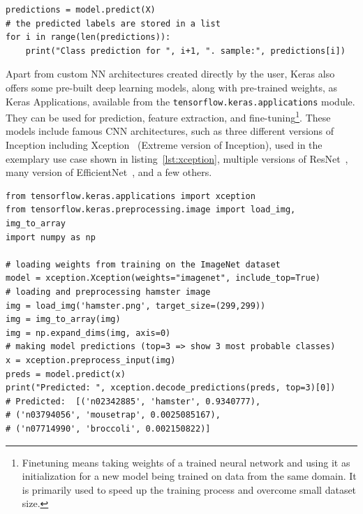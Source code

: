 \begin{lstlisting}[caption={Using a model to predict class labels for a given set of data.}, label={lst:predict}]
predictions = model.predict(X)
# the predicted labels are stored in a list
for i in range(len(predictions)):
    print("Class prediction for ", i+1, ". sample:", predictions[i])
\end{lstlisting}

Apart from custom NN architectures created directly by the user, Keras also offers some pre-built deep learning models,
along with pre-trained weights, as Keras Applications, available from the \texttt{tensorflow.keras.applications} module.
They can be used for prediction, feature extraction, and fine-tuning\footnote{Finetuning means taking weights
of a trained neural network and using it as initialization for a new model being trained on data from the same domain.
It is primarily used to speed up the training process and overcome small dataset size.}.
These models include famous CNN architectures, such as three different versions of Inception
including Xception~\cite{DBLP:journals/corr/Chollet16a} (Extreme version of Inception),
used in the exemplary use case shown in listing~\ref{lst:xception},
multiple versions of ResNet~\cite{DBLP:journals/corr/HeZRS15}, many version of
EfficientNet~\cite{DBLP:journals/corr/abs-1905-11946}, and a few others.

\begin{lstlisting}[caption={Classifying an image of a hamster by using the Xception~\cite{DBLP:journals/corr/Chollet16a}
NN architecture along with weights
pre-trained on the ImageNet\protect\footnotemark dataset}, label={lst:xception}]
from tensorflow.keras.applications import xception
from tensorflow.keras.preprocessing.image import load_img, img_to_array
import numpy as np

# loading weights from training on the ImageNet dataset
model = xception.Xception(weights="imagenet", include_top=True)
# loading and preprocessing hamster image
img = load_img('hamster.png', target_size=(299,299))
img = img_to_array(img)
img = np.expand_dims(img, axis=0)
# making model predictions (top=3 => show 3 most probable classes)
x = xception.preprocess_input(img)
preds = model.predict(x)
print("Predicted: ", xception.decode_predictions(preds, top=3)[0])
# Predicted:  [('n02342885', 'hamster', 0.9340777),
# ('n03794056', 'mousetrap', 0.0025085167),
# ('n07714990', 'broccoli', 0.002150822)]
\end{lstlisting}








